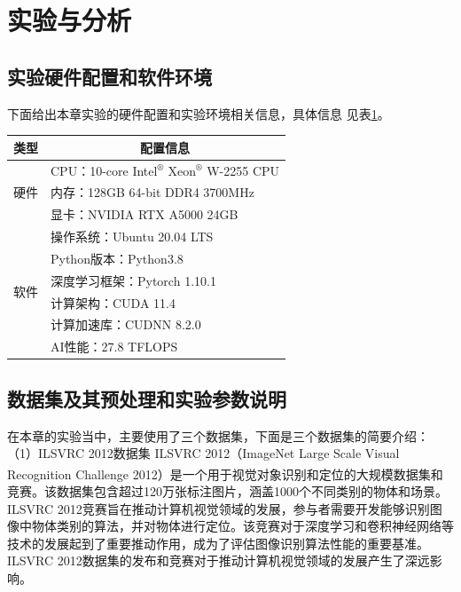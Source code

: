  
 
\section{实验与分析}\label{3:test}

\subsection{实验硬件配置和软件环境}
下面给出本章实验的硬件配置和实验环境相关信息，具体信息 见表\ref{tab:en}。

\begin{table}
	\renewcommand{\arraystretch}{1.5}
\centering
{}
\label{tab:en}
	\begin{tabular}{p{4cm}p{8cm}} 
\hline
类型                  & \multicolumn{1}{c}{配置信息}      \\ 
\hline
\multirow{3}{*}{硬件} & CPU：10-core Intel$^\circledR$ Xeon$^\circledR$ W-2255 CPU                  \\
& 内存：128GB 64-bit DDR4 3700MHz  \\
& 显卡：NVIDIA RTX A5000 24GB      \\ 
\hline
\multirow{6}{*}{软件} & 操作系统：Ubuntu 20.04 LTS         \\
& Python版本：Python3.8            \\
& 深度学习框架：Pytorch 1.10.1         \\
& 计算架构：CUDA 11.4                \\
& 计算加速库：CUDNN 8.2.0             \\
& AI性能：27.8 TFLOPS              \\
\hline
\end{tabular}
\end{table}


\subsection{数据集及其预处理和实验参数说明}
在本章的实验当中，主要使用了三个数据集，下面是三个数据集的简要介绍：
（1）ILSVRC 2012数据集
ILSVRC 2012（ImageNet Large Scale Visual Recognition Challenge 2012）\textsuperscript{\cite{ILSVRC}}是一个用于视觉对象识别和定位的大规模数据集和竞赛。该数据集包含超过120万张标注图片，涵盖1000个不同类别的物体和场景。ILSVRC 2012竞赛旨在推动计算机视觉领域的发展，参与者需要开发能够识别图像中物体类别的算法，并对物体进行定位。该竞赛对于深度学习和卷积神经网络等技术的发展起到了重要推动作用，成为了评估图像识别算法性能的重要基准。ILSVRC 2012数据集的发布和竞赛对于推动计算机视觉领域的发展产生了深远影响。

